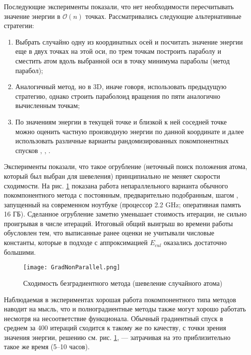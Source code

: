   Последующие эксперименты показали, что нет необходимости пересчитывать значение энергии в $\mathcal{O}\left( n \right)$ точках. Рассматривались следующие альтернативные стратегии: 
  \begin{enumerate}
    \item Выбрать случайно одну из координатных осей и посчитать значение энергии еще в двух точках на этой оси, по трем точкам построить параболу и сместить атом вдоль выбранной оси в точку минимума параболы (метод парабол); 
    \item Аналогичный метод, но в 3D, иначе говоря, использовать предыдущую стратегию, однако строить параболоид вращения по пяти аналогично вычисленным точкам; 
    \item По значениям энергии в текущей точке и близкой к ней соседней точке можно оценить частную производную энергии по данной координате и далее использовать различные варианты рандомизированных покомпонентных спусков \cite{conn2009introduction}, \cite{ghadimi2013stochastic}, \cite{wright2015coordinate}.
  \end{enumerate}
  Эксперименты показали, что такое огрубление (неточный поиск положения атома, который был выбран для шевеления) принципиально не меняет скорости сходимости. На рис. \ref{GF} показана работа непараллельного варианта обычного покомпонентного метода с постоянным, предварительно подобранным, шагом \cite{ghadimi2013stochastic}, запущенный на современном ноутбуке (процессор 2.2 GHz; оперативная память 16 ГБ). Сделанное огрубление заметно уменьшает стоимость итерации, не сильно проигрывая в числе итераций. Итоговый общий выигрыш во времени работы обусловлен тем, что выписанные ранее оценки не учитывали числовые константы, которые в подходе с аппроксимацией $E_{cul}$ оказались достаточно большими. 

  \begin{figure}
  \begin{center}
  \texttt{[image: GradNonParallel.png]}
  \end{center}
  \caption{Сходимость безградиентного метода (шевеление случайного атома)}
   \label{GF}
  \end{figure}

  Наблюдаемая в экспериментах хорошая работа покомпонентного типа методов наводит на мысль, что и полноградиентные методы также могут хорошо работать несмотря на несоответствие функционала. Обычный градиентный спуск в среднем за 400 итераций сходится к такому же по качеству, с точки зрения значения энергии, решению см. рис. \ref{GF}, --- затрачивая на это приблизительно такое же время (5--10 часов). 



